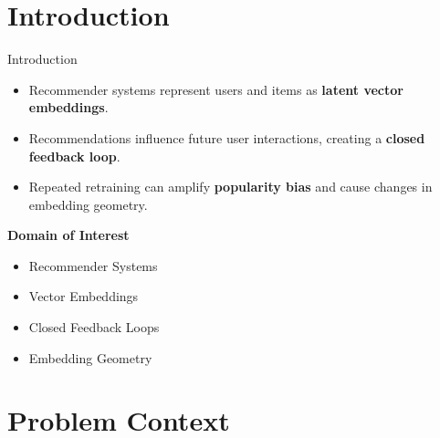 \documentclass[11pt,aspectratio=43,xcolor=table]{beamer}
\begin{document}
\section{Introduction}

\begin{frame}{Introduction}
\small

\begin{itemize}
    \item Recommender systems represent users and items as \textbf{latent vector embeddings}.
    \item Recommendations influence future user interactions, creating a \textbf{closed feedback loop}.
    \item Repeated retraining can amplify \textbf{popularity bias} and cause changes in embedding geometry.
\end{itemize}

\vspace{0.2cm}

\textbf{Domain of Interest}

\begin{itemize}
    \item Recommender Systems
    \item Vector Embeddings
    \item Closed Feedback Loops
    \item Embedding Geometry
\end{itemize}

\end{frame}

\section{Problem Context}
\end{document}
